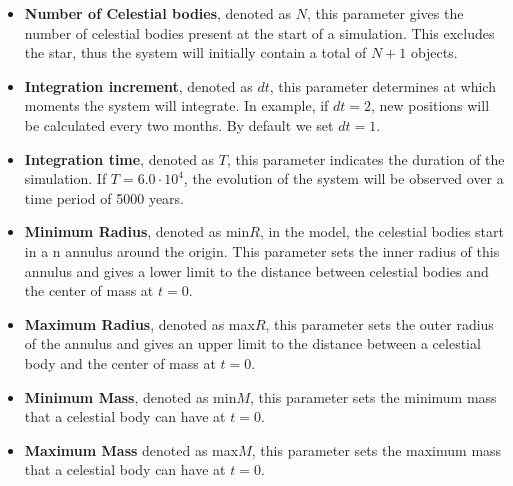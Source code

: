 \begin{itemize}
	\item \textbf{Number of Celestial bodies}, denoted as \(N\), this parameter gives the number of celestial bodies present at the start of a simulation. This excludes the star, thus the system will initially contain a total of \(N+1\) objects.
	\item \textbf{Integration increment}, denoted as \(dt\), this parameter determines at which moments the system will integrate. In example, if \(dt=2\), new positions will be calculated every two months. By default we set \(dt=1\).
	\item \textbf{Integration time}, denoted as \(T\), this parameter indicates the duration of the simulation. If \(T=6.0\cdot10^4\), the evolution of the system will be observed over a time period of 5000 years.
	\item \textbf{Minimum Radius}, denoted as min\(R\), in the model, the celestial bodies start in a n annulus around the origin. This parameter sets the inner radius of this annulus and gives a lower limit to the distance between celestial bodies and the center of mass at \(t=0\).
	\item \textbf{Maximum Radius}, denoted as max\(R\), this parameter sets the outer radius of the annulus and gives an upper limit to the distance between a celestial body and the center of mass at \(t=0\).
	\item \textbf{Minimum Mass}, denoted as min\(M\), this parameter sets the minimum mass that a celestial body can have at \(t=0\).
	\item \textbf{Maximum Mass} denoted as max\(M\), this parameter sets the maximum mass that a celestial body can have at \(t=0\).
\end{itemize}

